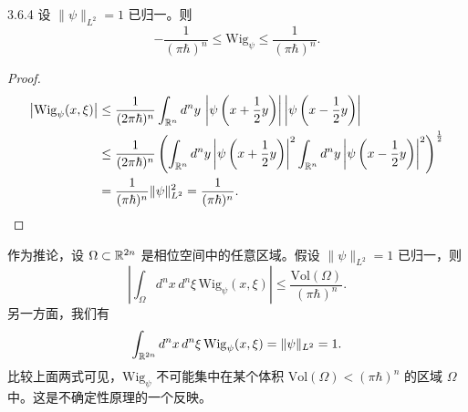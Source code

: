 \begin{proposition}{3.6.4}
  设 \(\|\psi\|_{L^2}=1\) 已归一。则
  \[
    -\frac{1}{(\pi\hbar)^n}\le\mathrm{Wig}_\psi
    \le\frac{1}{(\pi\hbar)^n}.
  \]
\end{proposition}

\begin{proof}
  \begin{align*}
    \left|\mathrm{Wig}_\psi(x,\xi)\right|
    &\le\frac{1}{(2\pi\hbar)^n}\int_{\mathbb{R}^n}d^ny\,
      \left|\psi\left(x+\frac12y\right)\right|
      \left|\psi\left(x-\frac12y\right)\right|\\
    &\le\frac{1}{(2\pi\hbar)^n}
      \left(\int_{\mathbb{R}^n}d^ny\left|\psi\left(x+\frac12y\right)\right|^2
      \int_{\mathbb{R}^n}d^ny\left|\psi\left(x-\frac12y\right)\right|^2
      \right)^{\frac12}\\
    &=\frac{1}{(\pi\hbar)^n}\|\psi\|_{L^2}^2
      =\frac{1}{(\pi\hbar)^n}.
  \end{align*}
\end{proof}

作为推论，设 \(\Omega\subset\mathbb{R}^{2n}\) 是相位空间中的任意区域。假设 \(\|\psi\|_{L^2}=1\) 已归一，则
\[
  \left|\int_\Omega d^nx\,d^n\xi\,\mathrm{Wig}_\psi(x,\xi)\right|
  \le\frac{\mathrm{Vol}(\Omega)}{(\pi\hbar)^n}.
\]
另一方面，我们有
\[
  \int_{\mathbb{R}^{2n}}d^nx\,d^n\xi\,\mathrm{Wig}_\psi(x,\xi)
  =\|\psi\|_{L^2}=1.
\]
比较上面两式可见，\(\mathrm{Wig}_\psi\) 不可能集中在某个体积 \(\mathrm{Vol}(\Omega)<(\pi\hbar)^n\) 的区域 \(\Omega\) 中。这是不确定性原理的一个反映。

